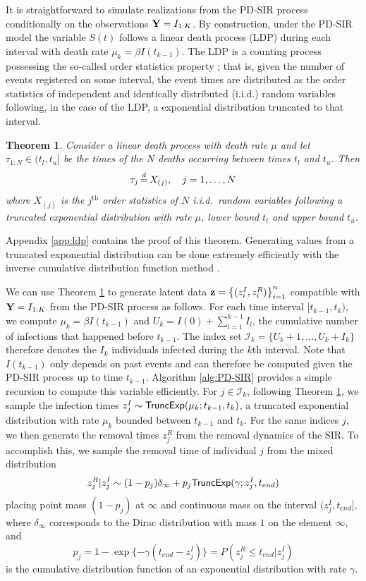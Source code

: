 \documentclass[11pt]{article}
\newtheorem{theorem}{Theorem}[section]
\begin{document}
	It is straightforward to simulate realizations from the PD-SIR process conditionally on the observations $\mathbf{Y} = I_{1:K}$. By construction, under the PD-SIR model the variable $S(t)$ follows a linear death process (LDP) during each interval with death rate $\mu_k = \beta I(t_{k-1})$. 
	The LDP is a counting process possessing the so-called order statistics property \cite{Neuts.1971}; that is, given the number of events registered on some interval, the event times are distributed as the order statistics of independent and identically distributed (i.i.d.) random variables following, in the case of the LDP, a exponential distribution truncated to that interval.
	\begin{theorem}
		\label{theo:ldp}
		Consider a linear death process with death rate $\mu$ and let $\tau_{1:N} \in (t_l, t_u]$ be the times of the $N$ deaths occurring between times $t_l$ and $t_u$. Then 
		$$\tau_j \,{\buildrel d \over =}\, X_{(j)}, \quad j = 1, \dots, N$$
		where $X_{(j)}$ is the $j^{\text{th}}$ order statistics of $N$ i.i.d.\ random variables following a truncated exponential distribution with rate $\mu$, lower bound $t_l$ and upper bound $t_u$.
	\end{theorem}
	Appendix \ref{app:ldp} contains the proof of this theorem. Generating values from a truncated exponential distribution can be done extremely efficiently with the inverse cumulative distribution function method \cite{Devroye.2006}. 
	
	We can use Theorem \ref{theo:ldp} to generate latent data  $\mathbf{z} = \left\lbrace (z^I_i, z^R_i)\right\rbrace_{i=1}^{n}$ compatible with $\mathbf{Y} = I_{1:K}$ from the PD-SIR process as follows. For each time interval $[t_{k-1}, t_k)$, we compute $\mu_k = \beta I(t_{k-1})$ and $U_k = I(0) + \sum_{l=1}^{k-1} I_l$, the cumulative number of infections that happened before $t_{k-1}$. The index set $\mathcal{I}_k = \{U_k + 1, \dots, U_k + I_k\}$ therefore denotes the $I_k$ individuals infected during the $k$th interval. Note that $I(t_{k-1})$ only depends on past events and can therefore be computed given the PD-SIR process up to time $t_{k-1}$. Algorithm \ref{alg:PD-SIR} provides a simple recursion to compute this variable efficiently. For $j \in \mathcal{I}_k$, following Theorem \ref{theo:ldp}, we sample the infection times $z^I_j \sim \textsf{TruncExp}(\mu_k; t_{k-1}, t_k)$, a truncated exponential distribution with rate $\mu_k$ bounded between $t_{k-1}$ and $t_k$. For the same indices $j$, we then generate the removal times $z^R_j$ from the removal dynamics of the SIR. To accomplish this, we sample the removal time of individual $j$ from the mixed distribution
	$$z^R_j|z^I_j \sim (1 - p_j) \delta_{\infty} + p_j \textsf{TruncExp}(\gamma; z^I_j, t_{end})$$
	placing point mass $(1 - p_j)$ at $\infty$ and continuous mass on the interval $(z^I_j, t_{end}]$,
	where $\delta_{\infty}$ corresponds to the Dirac distribution with mass $1$ on the element $\infty$, and
	$$p_j = 1 - \exp\{-\gamma (t_{end} - z^I_j)\} = P(z^R_j \le t_{end} | z^I_j)$$
	is the cumulative distribution function of an exponential distribution with rate $\gamma$. %
	
\end{document}
